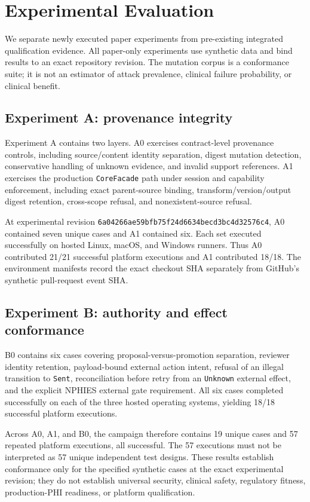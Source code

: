 \section{Experimental Evaluation}

We separate newly executed paper experiments from pre-existing integrated qualification evidence. All paper-only experiments use synthetic data and bind results to an exact repository revision. The mutation corpus is a conformance suite; it is not an estimator of attack prevalence, clinical failure probability, or clinical benefit.

\subsection{Experiment A: provenance integrity}
Experiment A contains two layers. A0 exercises contract-level provenance controls, including source/content identity separation, digest mutation detection, conservative handling of unknown evidence, and invalid support references. A1 exercises the production \texttt{CoreFacade} path under session and capability enforcement, including exact parent-source binding, transform/version/output digest retention, cross-scope refusal, and nonexistent-source refusal.

At experimental revision \texttt{6a04266ae59bfb75f24d6634becd3bc4d32576c4}, A0 contained seven unique cases and A1 contained six. Each set executed successfully on hosted Linux, macOS, and Windows runners. Thus A0 contributed 21/21 successful platform executions and A1 contributed 18/18. The environment manifests record the exact checkout SHA separately from GitHub's synthetic pull-request event SHA.

\subsection{Experiment B: authority and effect conformance}
B0 contains six cases covering proposal-versus-promotion separation, reviewer identity retention, payload-bound external action intent, refusal of an illegal transition to \texttt{Sent}, reconciliation before retry from an \texttt{Unknown} external effect, and the explicit NPHIES external gate requirement. All six cases completed successfully on each of the three hosted operating systems, yielding 18/18 successful platform executions.

Across A0, A1, and B0, the campaign therefore contains 19 unique cases and 57 repeated platform executions, all successful. The 57 executions must not be interpreted as 57 unique independent test designs. These results establish conformance only for the specified synthetic cases at the exact experimental revision; they do not establish universal security, clinical safety, regulatory fitness, production-PHI readiness, or platform qualification.

